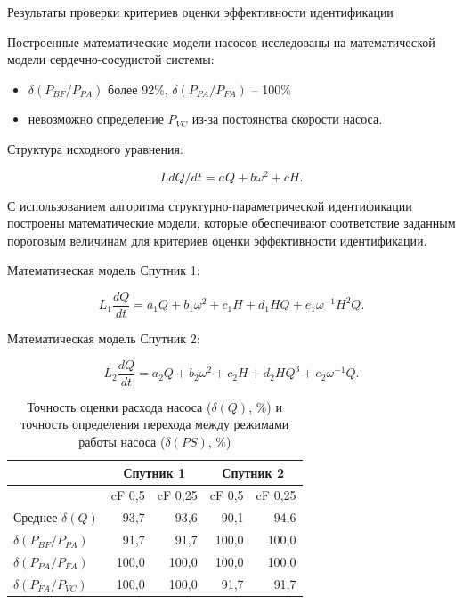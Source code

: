 \documentclass[a4paper, 9pt]{beamer}
\begin{document}
\begin{frame}{Результаты проверки критериев оценки эффективности идентификации}
\begin{minipage}[ht]{0.56\textwidth}
\tiny \vskip170pt
Построенные математические модели насосов исследованы на математической модели сердечно-сосудистой системы:

\begin{itemize}
 \item \vskip-4pt $\delta(P_{BF}/P_{PA})$ более 92\%,	 $\delta(P_{PA}/P_{FA})$ -- 100\%	\vskip-5pt
 \item \vskip-2pt невозможно определение $P_{VC}$ из-за постоянства скорости насоса.	\vskip-5pt
\end{itemize}

\end{minipage}
\hfill
\begin{minipage}[ht]{0.42\textwidth}

\vskip0pt
Структура исходного уравнения:

\vskip-4pt
\begin{equation}
LdQ/dt =  aQ + b\omega^2 + cH.
\end{equation}

\vskip-2pt
С использованием алгоритма структурно-параметрической идентификации построены математические модели, которые обеспечивают соответствие заданным пороговым величинам для критериев оценки эффективности идентификации.

\vskip5pt

Математическая модель Спутник 1:

\vskip-8pt
\begin{equation}
	L_1\frac{dQ}{dt} = a_1Q + b_1\omega^2 + c_1H + d_1HQ + e_1\omega^{-1} H^2 Q.
\end{equation}

Математическая модель Спутник 2:

\vskip-8pt
\begin{equation}
	L_2\frac{dQ}{dt} = a_2Q + b_2\omega^2 + c_2H + d_2HQ^3 + e_2\omega^{-1}Q.
\end{equation}

\vskip-18pt

\setcounter{table}{0}
\begin{table}
\caption{\tiny Точность оценки расхода насоса ($\delta(Q)$, \%) и точность определения перехода между режимами работы насоса ($\delta(PS)$, \%)}\vskip-9pt
\begin{tabular}{lrrrr}
\toprule
 & \multicolumn{2}{c}{Спутник 1} & \multicolumn{2}{c}{Спутник 2} \\
\midrule
    	 & cF 0,5 & cF 0,25 & cF 0,5 & cF 0,25 \\
		\midrule
		Среднее $\delta(Q)$ & 93,7 & 93,6 & 90,1 & 94,6 \\
		\midrule
$\delta(P_{BF}/P_{PA})$		& 91,7			&	91,7			& 100,0		& 100,0\\
$\delta(P_{PA}/P_{FA})$		& 100,0		&	100,0		& 100,0		& 100,0\\
$\delta(P_{FA}/P_{VC})$		& 	100,0		&	100,0		& 91,7			& 91,7 \\
\bottomrule
\end{tabular}
\end{table}


\end{minipage}
\end{frame}
\end{document}
